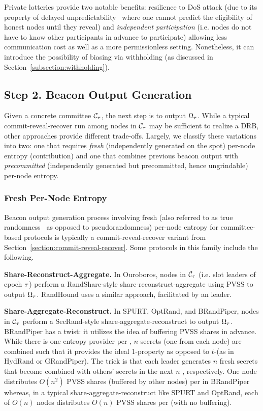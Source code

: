 Private lotteries provide two notable benefits: resilience to DoS attack (due to its property of delayed unpredictability~\cite{azouvi2018winning} where one cannot predict the eligibility of honest nodes until they reveal) and \textit{independent participation} (i.e. nodes do not have to know other participants in advance to participate) allowing less communication cost as well as a more permissionless setting. Nonetheless, it can introduce the possibility of biasing via withholding (as discussed in Section~\ref{subsection:withholding}).

\subsection{Step 2. Beacon Output Generation}
\label{subsection:beacon-output-generation}
Given a concrete committee $\mathcal{C}_\tau$, the next step is to output $\Omega_\tau$. While a typical commit-reveal-recover run among nodes in $\mathcal{C}_\tau$ may be sufficient to realize a DRB, other approaches provide different trade-offs. Largely, we classify these variations into two: one that requires \textit{fresh} (independently generated on the spot) per-node entropy (contribution) and one that combines previous beacon output with \textit{precommitted} (independently generated but precommitted, hence ungrindable) per-node entropy.

\subsubsection{Fresh Per-Node Entropy}
\label{subsubsection:fresh}
Beacon output generation process involving fresh (also referred to as true randomness~\cite{cascudo2021mt, das2021spurt} as opposed to pseudorandomness) per-node entropy for committee-based protocols is typically a commit-reveal-recover variant from Section~\ref{section:commit-reveal-recover}. Some protocols in this family include the following.

\noindent\textbf{Share-Reconstruct-Aggregate.} In Ouroboros, nodes in $\mathcal{C}_\tau$ (i.e. slot leaders of epoch $\tau$) perform a RandShare-style share-reconstruct-aggregate using PVSS to output $\Omega_\tau$. RandHound uses a similar approach, facilitated by an \epoch leader.

\noindent\textbf{Share-Aggregate-Reconstruct.} In SPURT, OptRand, and BRandPiper, nodes in $\mathcal{C}_\tau$ perform a SecRand-style share-aggregate-reconstruct to output $\Omega_\tau$. BRandPiper has a twist: it utilizes the idea of buffering PVSS shares in advance. While there is one entropy provider per \epoch, $n$ secrets (one from each node) are combined such that it provides the ideal 1-\interunpredictability property as opposed to $t$-\interunpredictability (as in HydRand or GRandPiper). The trick is that each \epoch leader generates $n$ fresh secrets that become combined with others' secrets in the next $n$ \epochs, respectively. One node distributes $O(n^2)$ PVSS shares (buffered by other nodes) per \epoch in BRandPiper whereas, in a typical share-aggregate-reconstruct like SPURT and OptRand, each of $O(n)$ nodes distributes $O(n)$ PVSS shares per \epoch (with no buffering).


